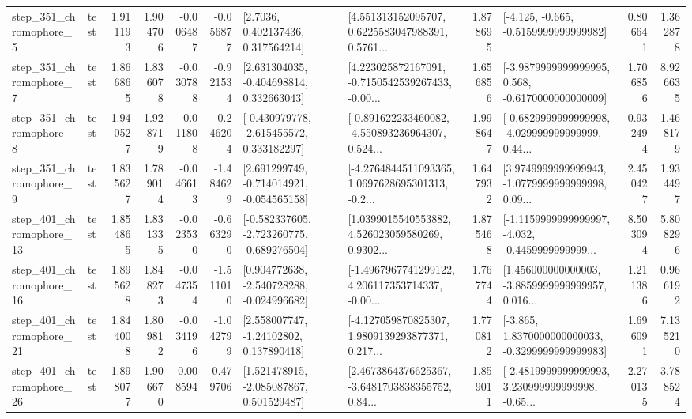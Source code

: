\begin{tabular}{llrrrrllrlrr}
   step\_351\_chromophore\_5 &      test &      1.911193 &    1.904706 &     -0.006487 & -0.056877 &          [2.7036, 0.402137436, 0.317564214] &  [4.551313152095707, 0.6225583047988391, 0.5761... &       1.878695 &              [-4.125, -0.665, -0.5159999999999982] &            0.806641 &          1.362878 \\
   step\_351\_chromophore\_7 &      test &      1.866865 &    1.836078 &     -0.030788 & -0.921534 &    [2.631304035, -0.404698814, 0.332663043] &  [4.223025872167091, -0.7150542539267433, -0.00... &       1.656856 &  [-3.9879999999999995, 0.568, -0.6170000000000009] &            1.706856 &          8.926635 \\
   step\_351\_chromophore\_8 &      test &      1.940527 &    1.928719 &     -0.011808 & -0.246204 &   [-0.430979778, -2.615455572, 0.333182297] &  [-0.891622233460082, -4.550893236964307, 0.524... &       1.998647 &  [-0.6829999999999998, -4.029999999999999, 0.44... &            0.932494 &          1.468179 \\
   step\_351\_chromophore\_9 &      test &      1.835627 &    1.789014 &     -0.046613 & -1.484629 &   [2.691299749, -0.714014921, -0.054565158] &  [-4.2764844511093365, 1.0697628695301313, -0.2... &       1.647932 &  [3.9749999999999943, -1.0779999999999998, 0.09... &            2.450427 &          1.934497 \\
  step\_401\_chromophore\_13 &      test &      1.854865 &    1.831335 &     -0.023530 & -0.663290 &  [-0.582337605, -2.723260775, -0.689276504] &  [1.0399015540553882, 4.526023059580269, 0.9302... &       1.875468 &  [-1.1159999999999997, -4.032, -0.4459999999999... &            8.503094 &          5.808296 \\
  step\_401\_chromophore\_16 &      test &      1.895628 &    1.848273 &     -0.047354 & -1.511010 &   [0.904772638, -2.540728288, -0.024996682] &  [-1.4967967741299122, 4.206117353714337, -0.00... &       1.767744 &  [1.456000000000003, -3.8859999999999957, 0.016... &            1.211386 &          0.966192 \\
  step\_401\_chromophore\_21 &      test &      1.844008 &    1.809812 &     -0.034196 & -1.042799 &     [2.558007747, -1.24102802, 0.137890418] &  [-4.127059870825307, 1.9809139293877371, 0.217... &       1.770812 &  [-3.865, 1.8370000000000033, -0.3299999999999983] &            1.696091 &          7.135210 \\
  step\_401\_chromophore\_26 &      test &      1.898077 &    1.906670 &      0.008594 &  0.479706 &    [1.521478915, -2.085087867, 0.501529487] &  [2.4673864376625367, -3.6481703838355752, 0.84... &       1.859011 &  [-2.4819999999999993, 3.230999999999998, -0.65... &            2.270135 &          3.788524 \\

\end{tabular}
